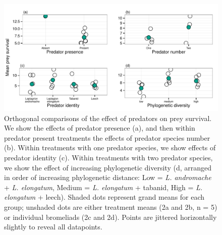 \begin{figure}[htbp]
\centering
\includegraphics{figures/FIG_2.pdf}
\caption{Orthogonal comparisons of the effect of predators on
prey survival. We show the effects of predator presence (a), and then
within predator present treatments the effects of predator species
number (b). Within treatments with one predator species, we show effects
of predator identity (c). Within treatments with two predator species,
we show the effect of increasing phylogenetic diversity (d, arranged in
order of increasing phylogenetic distance: Low = \emph{L. andromache} +
\emph{L. elongatum}, Medium = \emph{L. elongatum} + tabanid, High =
\emph{L. elongatum} + leech). Shaded dots represent grand means for each
group; unshaded dots are either treatment means (2a and 2b, n = 5) or
individual bromeliads (2c and 2d). Points are jittered horizontally
slightly to reveal all datapoints.}
\end{figure}



